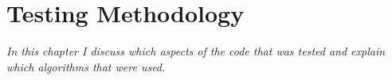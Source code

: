 \chapter{Testing Methodology}

\textit{In this chapter I discuss which aspects of the code that was tested and explain which algorithms that were used.}




